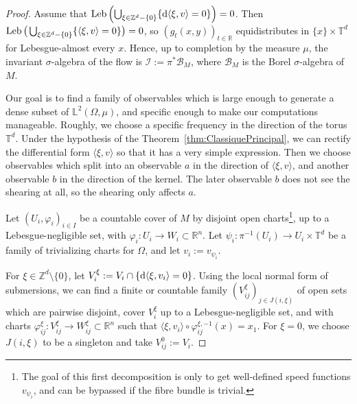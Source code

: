 \documentclass[10pt]{amsart}
\theoremstyle{definition}\newtheorem{defi}[theo]{Definition}\newtheorem{rema}[theo]{Remark}\newtheorem{exam}[theo]{Example}\newtheorem{exem}[theo]{Example}\newtheorem{nota}[theo]{Notation}
\DeclareMathOperator{\Leb}{Leb}
\newcommand{\Z}{\mathbb{Z}}
\newcommand{\R}{\mathbb{R}}
\newcommand{\Lbb}{\mathbb{L}}
\newcommand{\Tbb}{\mathbb{T}}
\newcommand{\Bcal}{\mathcal{B}}
\newcommand{\Ical}{\mathcal{I}}
\newcommand{\de}{{\rm d}}
\begin{document}
\begin{proof}
Assume that $\Leb \left(\bigcup_{\xi \in \Z^d - \{0\}} \{ \de \langle \xi, v \rangle = 0\}\right) = 0$. Then $\Leb \big(\bigcup_{\xi \in \Z^d - \{0\}} \{ \langle \xi,\linebreak v \rangle= 0\}\big)= 0$, so $(g_t (x,y))_{t \in \R}$ equidistributes in $\{x\} \times \Tbb^d$ for Lebesgue-almost every $x$. Hence, up to completion by the measure $\mu$, the invariant $\sigma$-algebra of the flow is $\Ical := \pi^* \Bcal_M$, where $\Bcal_M$ is the Borel $\sigma$-algebra of $M$.


Our goal is to find a family of observables which is large enough to generate a dense subset of $\Lbb^2 (\Omega, \mu)$, and specific enough to make our computations manageable. Roughly, we choose a specific frequency in the direction of the torus $\Tbb^d$. Under the hypothesis of the Theorem~\ref{thm:ClassiquePrincipal}, we can rectify the differential form $\langle \xi, v \rangle$ so that it has a very simple expression. Then we choose observables which split into an observable $a$ in the direction of $\langle \xi, v \rangle$, and another observable $b$ in the direction of the kernel. The later observable $b$ does not see the shearing at all, so the shearing only affects $a$.


Let $(U_i, \varphi_i)_{i \in I}$ be a countable cover of $M$ by disjoint open charts\footnote{The goal of this first decomposition is only to get well-defined speed functions $v_{\psi_i}$, and can be bypassed if the fibre bundle is trivial.}, up to a Lebesgue-negligible set, with $\varphi_i : U_i
\to W_i \subset \R^n$. Let $\psi_i : \pi^{-1} (U_i) \to U_i \times \Tbb^d$ be a family of trivializing charts for $\Omega$, and let $v_i := v_{\psi_i}$.


For $\xi \in \Z^d \setminus \{0\}$, let $V_i^\xi := V_i \cap \{ \de \langle \xi, v_i \rangle = 0\}$. Using the local normal form of submersions, we can find a finite or countable family $(V_{ij}^\xi)_{j \in J(i,\xi)}$ of open sets which are pairwise disjoint, cover $V_i^\xi$ up to a Lebesgue-negligible set, and with charts $\varphi_{ij}^\xi : V_{ij}^\xi \to W_{ij}^\xi \subset \R^n$ such that $\langle \xi, v_i \rangle \circ \varphi_{ij}^{\xi,-1} (x) = x_1$. For $\xi=0$, we choose $J(i,\xi)$ to be a singleton and take $V_{ij}^0:=V_i$.



\end{proof}
\end{document}
